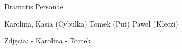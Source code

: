 Dramatis Personae

Karolina,
Kasia (Cybulka)
Tomek (Put)
Paweł (Kłeczi)

Zdjęcia:
- Karolina
- Tomek